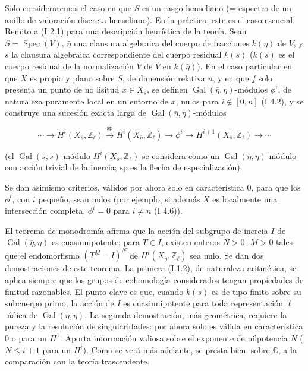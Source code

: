 Solo consideraremos el caso en que $S$ es un rasgo henseliano (= espectro de un
anillo de valoración discreta henseliano). En la práctica, este es el caso esencial. Remito
a (I 2.1) para una descripción heurística de la teoría. Sean $S=\operatorname{Spec}(V)$, $\bar\eta$
una clausura algebraica del cuerpo de fracciones $k(\eta)$ de $V$, y $\bar s$ la clausura algebraica
correspondiente del cuerpo residual $k(s)$ ($k(\bar s)$ es el cuerpo residual de la normalización
$\bar V$ de $V$ en $k(\bar\eta)$). En el caso particular en que $X$ es propio y plano sobre
$S$, de dimensión relativa $n$, y en que $f$ solo presenta un punto de no lisitud
$x\in X_s$, se definen $\operatorname{Gal}(\bar\eta,\eta)$-módulos $\phi^i$, de naturaleza puramente local en un entorno
de $x$, nulos para $i\notin[0,n]$ (I 4.2), y se construye una sucesión exacta larga
de $\operatorname{Gal}(\bar\eta,\eta)$-módulos

\[
\cdots \longrightarrow H^i(X_{\bar s},\mathbb Z_\ell)
\xrightarrow{\mathrm{sp}} H^i(X_{\bar\eta},\mathbb Z_\ell)
\longrightarrow \phi^i
\longrightarrow H^{i+1}(X_{\bar s},\mathbb Z_\ell)
\longrightarrow \cdots
\]

(el $\operatorname{Gal}(\bar s,s)$-módulo $H^i(X_{\bar s},\mathbb Z_\ell)$ se considera como un
$\operatorname{Gal}(\bar\eta,\eta)$-módulo con acción trivial de la inercia; $\mathrm{sp}$ es la flecha de especialización).

Se dan asimismo criterios, válidos por ahora solo en característica
$0$, para que los $\phi^i$, con $i$ pequeño, sean nulos (por ejemplo, si además $X$ es
localmente una intersección completa, $\phi^i=0$ para $i\ne n$ (I 4.6)).
\clearpage

El teorema de monodromía afirma que la acción del subgrupo de inercia $I$
de $\operatorname{Gal}(\bar\eta,\eta)$ es cuasiunipotente: para $T\in I$, existen enteros $N>0$,
$M>0$ tales que el endomorfismo $(T^M-I)^N$ de $H^i(X_{\bar\eta},\mathbb Z_\ell)$ sea nulo. Se dan dos
demostraciones de este teorema. La primera (I.1.2), de naturaleza aritmética, se aplica
siempre que los grupos de cohomología considerados tengan propiedades de finitud razonables.
El punto clave es que, cuando $k(s)$ es de tipo finito sobre su subcuerpo
primo, la acción de $I$ es cuasiunipotente para toda representación $\ell$-ádica de
$\operatorname{Gal}(\bar\eta,\eta)$. La segunda demostración, más geométrica, requiere la pureza y la resolución
de singularidades: por ahora solo es válida en característica $0$
o para un $H^1$. Aporta información valiosa sobre el exponente de nilpotencia
$N$ ($N\leq i+1$ para un $H^i$). Como se verá más adelante, se presta bien,
sobre $\mathbb C$, a la comparación con la teoría trascendente.

